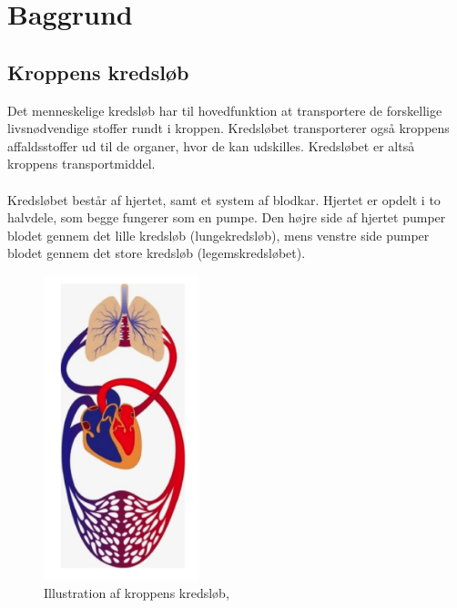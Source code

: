 \chapter{Baggrund}
\section{Kroppens kredsløb}
Det menneskelige kredsløb har til hovedfunktion at transportere de forskellige livsnødvendige stoffer rundt i kroppen. Kredsløbet transporterer også kroppens affaldsstoffer ud til de organer, hvor de kan udskilles. Kredsløbet er altså kroppens transportmiddel. 
\\ \\
Kredsløbet består af hjertet, samt et system af blodkar. Hjertet er opdelt i to halvdele, som begge fungerer som en pumpe. Den højre side af hjertet pumper blodet gennem det lille kredsløb (lungekredsløb), mens venstre side pumper blodet gennem det store kredsløb (legemskredsløbet). 

\begin{figure}[H]
	\centering
	\includegraphics[width=0.4\textwidth]{Figurer/Snip20151209_69}
	\caption{Illustration af kroppens kredsløb, \protect\cite{Legemkredslob billede}}
	\end{figure}

